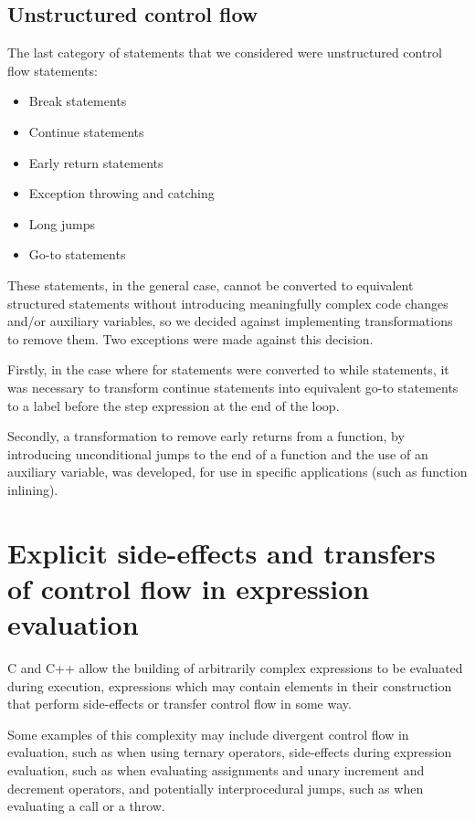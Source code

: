 \subsection{Unstructured control flow}

The last category of statements that we considered were unstructured control flow statements:

\begin{itemize}
    \item Break statements
    \item Continue statements
    \item Early return statements
    \item Exception throwing and catching
    \item Long jumps
    \item Go-to statements
\end{itemize}

These statements, in the general case, cannot be converted to equivalent structured statements without introducing meaningfully complex code changes and/or auxiliary variables, so we decided against implementing transformations to remove them. Two exceptions were made against this decision.

Firstly, in the case where for statements were converted to while statements, it was necessary to transform continue statements into equivalent go-to statements to a label before the step expression at the end of the loop.

Secondly, a transformation to remove early returns from a function, by introducing unconditional jumps to the end of a function and the use of an auxiliary variable, was developed, for use in specific applications (such as function inlining).

\section{Explicit side-effects and transfers of control flow in expression evaluation}\label{sec:subset-expressions}

C and C++ allow the building of arbitrarily complex expressions to be evaluated during execution, expressions which may contain elements in their construction that perform side-effects or transfer control flow in some way.

Some examples of this complexity may include divergent control flow in evaluation, such as when using ternary operators, side-effects during expression evaluation, such as when evaluating assignments and unary increment and decrement operators, and potentially interprocedural jumps, such as when evaluating a call or a throw.

